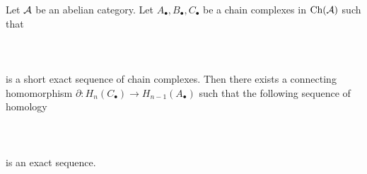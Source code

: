 \documentclass[a4paper]{article}
\begin{document}
\begin{thm}{}{} Let $\mathcal{A}$ be an abelian category. Let $A_\bullet,B_\bullet,C_\bullet$ be a chain complexes in $\text{Ch}(\mathcal{A})$ such that \\~\\
\\~\\
is a short exact sequence of chain complexes. Then there exists a connecting homomorphism $\partial:H_n(C_\bullet)\to H_{n-1}(A_\bullet)$ such that the following sequence of homology  \\~\\
\\~\\
is an exact sequence. 
\end{thm}
\end{document}
